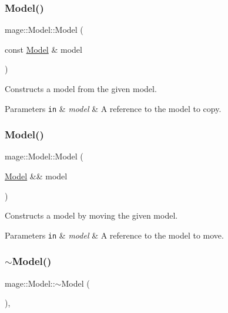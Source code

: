 \subsubsection{\texorpdfstring{Model()}{Model()}\hspace{0.1cm}{\footnotesize\ttfamily [2/3]}}
{\footnotesize\ttfamily mage\+::\+Model\+::\+Model (\begin{DoxyParamCaption}\item[{const \hyperlink{classmage_1_1_model}{Model} \&}]{model }\end{DoxyParamCaption})}

Constructs a model from the given model.


\begin{DoxyParams}[1]{Parameters}
\mbox{\tt in}  & {\em model} & A reference to the model to copy. \\
\hline
\end{DoxyParams}
\hypertarget{classmage_1_1_model_a71abc57cde3bd6270de88bfa3aa47601}{}\label{classmage_1_1_model_a71abc57cde3bd6270de88bfa3aa47601} 
\subsubsection{\texorpdfstring{Model()}{Model()}\hspace{0.1cm}{\footnotesize\ttfamily [3/3]}}
{\footnotesize\ttfamily mage\+::\+Model\+::\+Model (\begin{DoxyParamCaption}\item[{\hyperlink{classmage_1_1_model}{Model} \&\&}]{model }\end{DoxyParamCaption})\hspace{0.3cm}{\ttfamily [default]}}

Constructs a model by moving the given model.


\begin{DoxyParams}[1]{Parameters}
\mbox{\tt in}  & {\em model} & A reference to the model to move. \\
\hline
\end{DoxyParams}
\hypertarget{classmage_1_1_model_af9f45ed2dcf470f85bbfd144ca9857a7}{}\label{classmage_1_1_model_af9f45ed2dcf470f85bbfd144ca9857a7} 
\subsubsection{\texorpdfstring{$\sim$\+Model()}{~Model()}}
{\footnotesize\ttfamily mage\+::\+Model\+::$\sim$\+Model (\begin{DoxyParamCaption}{ }\end{DoxyParamCaption})\hspace{0.3cm}{\ttfamily [virtual]}, {\ttfamily [default]}}

